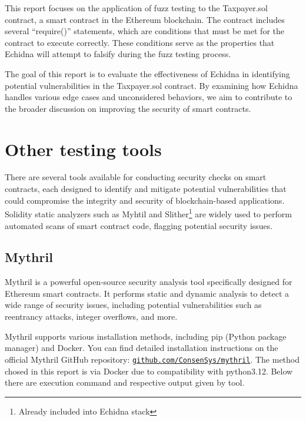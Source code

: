 \documentclass{article}
\begin{document}
This report focuses on the application of fuzz testing to 
the Taxpayer.sol contract, a smart contract in the Ethereum blockchain. 
The contract includes several ``require()'' statements, which are 
conditions that must be met for the contract to execute correctly. 
These conditions serve as the properties that Echidna will attempt to 
falsify during the fuzz testing process.

The goal of this report is to evaluate the effectiveness of Echidna 
in identifying potential vulnerabilities in the Taxpayer.sol contract. 
By examining how Echidna handles various edge cases and unconsidered 
behaviors, we aim to contribute to the broader discussion on improving 
the security of smart contracts.

\section{Other testing tools}
There are several tools available for conducting security checks on smart contracts, each designed to identify and mitigate potential vulnerabilities that could compromise the integrity and security of blockchain-based applications. Solidity static analyzers such as Myhtil and Slither\footnote{Already included into Echidna stack} are widely used to perform automated scans of smart contract code, flagging potential security issues. 
\subsection{Mythril}
Mythril is a powerful open-source security analysis tool specifically designed for Ethereum smart contracts. It performs static and dynamic analysis to detect a wide range of security issues, including potential vulnerabilities such as reentrancy attacks, integer overflows, and more.

Mythril supports various installation methods, including pip (Python package manager) and Docker. 
You can find detailed installation instructions on the official Mythril 
GitHub repository: \texttt{\href{https://github.com/ConsenSys/mythril}{github.com/ConsenSys/mythril}}. 
The method chosed in this report is via Docker due to compatibility with python3.12. 
Below there are execution command and respective output given by tool.
\end{document}
